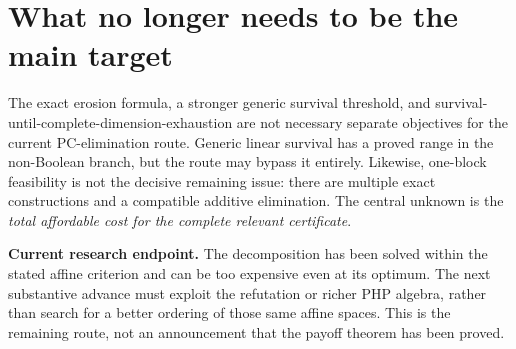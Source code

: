 \section{What no longer needs to be the main target}
The exact erosion formula, a stronger generic survival threshold, and survival-until-complete-dimension-exhaustion are not necessary separate objectives for the current PC-elimination route. Generic linear survival has a proved range in the non-Boolean branch, but the route may bypass it entirely. Likewise, one-block feasibility is not the decisive remaining issue: there are multiple exact constructions and a compatible additive elimination. The central unknown is the \emph{total affordable cost for the complete relevant certificate}.

\begin{statusbox}
\textbf{Current research endpoint.} The decomposition has been solved within the stated affine criterion and can be too expensive even at its optimum. The next substantive advance must exploit the refutation or richer PHP algebra, rather than search for a better ordering of those same affine spaces. This is the remaining route, not an announcement that the payoff theorem has been proved.
\end{statusbox}
